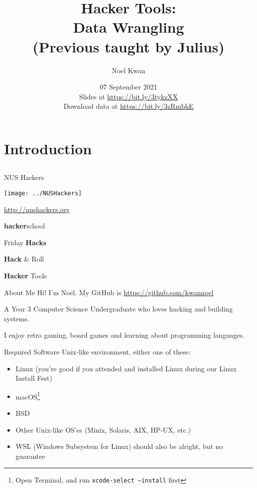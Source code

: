 \documentclass[12pt]{beamer}
\title{Hacker Tools: \\Data Wrangling \\ (Previous taught by Julius)}
\author{Noel Kwan}
\date{07 September 2021 \\ Slides at \url{https://bit.ly/3tykzXX} \\ Download data at \url{https://bit.ly/3zRmbhE}}
\begin{document}
\frame[plain]{\titlepage}

\section{Introduction}
\subsection{}

\begin{frame}{NUS Hackers}

  \begin{center}
    \texttt{[image: ../NUSHackers]}

    \url{http://nushackers.org}
  \end{center}

  \begin{center}
    \textbf{hacker}school

    Friday \textbf{Hacks}

    \textbf{Hack} \& Roll

    \textbf{Hacker} Tools
  \end{center}

\end{frame}

\begin{frame}{About Me}
  Hi! I'm Noel. My GitHub is \url{https://github.com/kwannoel}

  A Year 3 Computer Science Undergraduate who loves hacking and building systems.

  I enjoy retro gaming, board games and learning about programming languages.

\end{frame}

\begin{frame}{Required Software}
  Unix-like environment, either one of these:
  \begin{itemize}
    \item Linux (you're good if you attended and installed Linux during our Linux Install Fest)
    \item macOS\footnote{Open Terminal, and run \texttt{xcode-select --install} first}
    \item BSD
    \item Other Unix-like OS'es (Minix, Solaris, AIX, HP-UX, etc.)
    \item WSL (Windows Subsystem for Linux) should also be alright, but no guarantee
  \end{itemize}
\end{frame}
\end{document}

